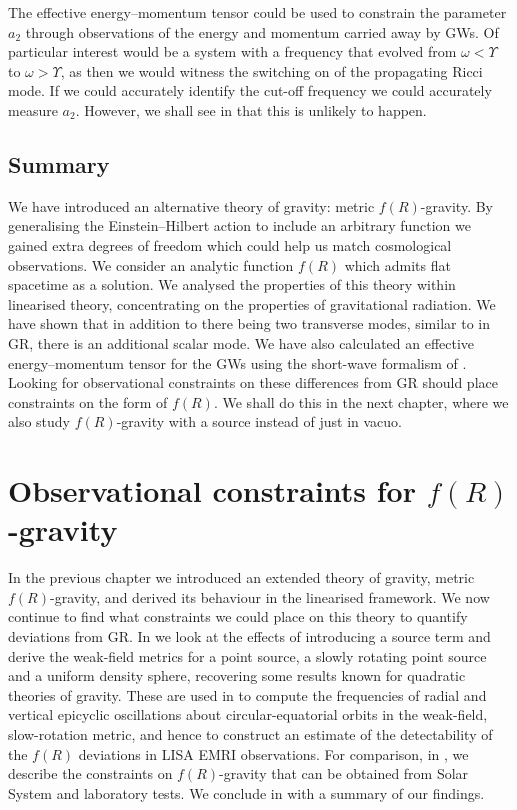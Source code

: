 The effective energy--momentum tensor could be used to constrain the parameter $a_2$ through observations of the energy and momentum carried away by GWs. Of particular interest would be a system with a frequency that evolved from $\omega < \Upsilon$ to $\omega > \Upsilon$, as then we would witness the switching on of the propagating Ricci mode. If we could accurately identify the cut-off frequency we could accurately measure $a_2$. However, we shall see in  that this is unlikely to happen.

\section{Summary}

We have introduced an alternative theory of gravity: metric $f(R)$-gravity. By generalising the Einstein--Hilbert action to include an arbitrary function we gained extra degrees of freedom which could help us match cosmological observations. We consider an analytic function $f(R)$ which admits flat spacetime as a solution. We analysed the properties of this theory within linearised theory, concentrating on the properties of gravitational radiation. We have shown that in addition to there being two transverse modes, similar to in GR, there is an additional scalar mode. We have also calculated an effective energy--momentum tensor for the GWs using the short-wave formalism of \citet{Isaacson1968,Isaacson1968a}. Looking for observational constraints on these differences from GR should place constraints on the form of $f(R)$. We shall do this in the next chapter, where we also study $f(R)$-gravity with a source instead of just in vacuo.


\chapter{Observational constraints for $f(R)$-gravity}\label{ch:f-R2}

In the previous chapter we introduced an extended theory of gravity, metric $f(R)$-gravity, and derived its behaviour in the linearised framework. We now continue to find what constraints we could place on this theory to quantify deviations from GR. In  we look at the effects of introducing a source term and derive the weak-field metrics for a point source, a slowly rotating point source and a uniform density sphere, recovering some results known for quadratic theories of gravity. These are used in  to compute the frequencies of radial and vertical epicyclic oscillations about circular-equatorial orbits in the weak-field, slow-rotation metric, and hence to construct an estimate of the detectability of the $f(R)$ deviations in LISA EMRI observations. For comparison, in , we describe the constraints on $f(R)$-gravity that can be obtained from Solar System and laboratory tests. We conclude in  with a summary of our findings.

